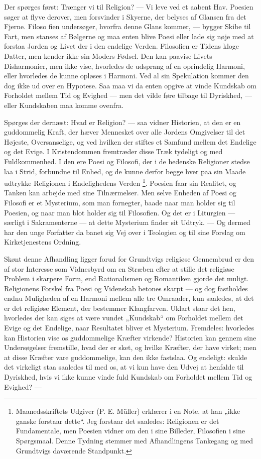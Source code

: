 \documentclass[12pt,a4paper,openany]{book}
\newcommand{\opage}[1]{\marginnote{\footnotesize\textit{[#1]}}}
\begin{document}
Der spørges først: Trænger vi til Religion? --- Vi leve ved et aabent Hav.
Poesien søger at flyve derover, men forsvinder i Skyerne, der belyses af
Glansen fra det Fjerne. Filoso%
\setcounter{footnote}{0}%
\opage{59}fien undersøger, hvorfra denne Glans kommer, --- bygger Skibe til
Fart, men stanses af Bølgerne og maa enten blive Poesi eller lade sig nøje med
at forstaa Jorden og Livet der i den endelige Verden. Filosofien er Tidens
kloge Datter, men kender ikke sin Moders Fødsel. Den kan paavise Livets
Disharmonier, men ikke vise, hvorledes de udsprang af en oprindelig Harmoni,
eller hvorledes de kunne opløses i Harmoni. Ved al sin Spekulation kommer den
dog ikke ud over en Hypotese. Saa maa vi da enten opgive at vinde Kundskab om
Forholdet mellem Tid og Evighed --- men det vilde føre tilbage til Dyriskhed,
--- eller Kundskaben maa komme ovenfra.

Spørges der dernæst: Hvad er Religion? --- saa vidner Historien, at den er en
guddommelig Kraft, der hæver Mennesket over alle Jordens Omgivelser til det
Højeste, Oversanselige, og ved hvilken der stiftes et Samfund mellem det
Endelige og det Evige. I Kristendommen fremtræder disse Træk tydeligt og med
Fuldkommenhed. I den ere Poesi og Filosofi, der i de hedenske Religioner stedse
laa i Strid, forbundne til Enhed, og de kunne derfor begge hver paa sin Maade
udtrykke Religionen i Endelighedens Verden%
\footnote[1]{Maanedsskriftets Udgiver (P. E. Müller) erklærer i en Note, at han
„ikke ganske forstaar dette“. Jeg forstaar det saaledes: Religionen er det
Fundamentale, men Poesien vidner om den i sine Billeder, Filosofien i sine
Spørgsmaal. Denne Tydning stemmer med Afhandlingens Tankegang og med Grundtvigs
daværende Standpunkt.}. Poesien faar sin Realitet, og Tanken kan arbejde med
sine Tilnærmelser. Men selve Enheden af Poesi og Filosofi er et Mysterium, som
man fornegter, baade naar man holder sig til Poesien, og naar man blot holder
sig til Filosofien. Og det er i Liturgien --- særligt i Sakramenterne --- at
dette Mysterium finder sit Udtryk. --- Og dermed har den unge Forfatter da
banet sig Vej over i Teologien og til sine Forslag om Kirketjenestens Ordning.

Skønt denne Afhandling ligger forud for Grundtvigs religiøse Gennembrud er den
af stor Interesse som Vidnesbyrd om en Stræben efter at stille det religiøse
Problem i skarpere
\setcounter{footnote}{0}%
\opage{60}Form, end Rationalismen og Romantiken gjorde det muligt. Religionens
Forskel fra Poesi og Videnskab betones skarpt --- og dog fastholdes endnu
Muligheden af en Harmoni mellem alle tre Omraader, kun saaledes, at det er det
religiøse Element, der bestemmer Klangfarven. Uklart staar det hen, hvorledes
der kan siges at være vundet „Kundskab“ om Forholdet mellem det Evige og det
Endelige, naar Resultatet bliver et Mysterium. Fremdeles: hvorledes kan
Historien vise os guddommelige Kræfter virkende? Historien kan gennem sine
Undersøgelser fremstille, hvad der er sket, og hvilke Kræfter, der have virket;
men at disse Kræfter vare guddommelige, kan den ikke fastslaa. Og endeligt:
skulde det virkeligt staa saaledes til med os, at vi kun have den Udvej at
henfalde til Dyriskhed, hvis vi ikke kunne vinde fuld Kundskab om Forholdet
mellem Tid og Evighed? ---
\end{document}
